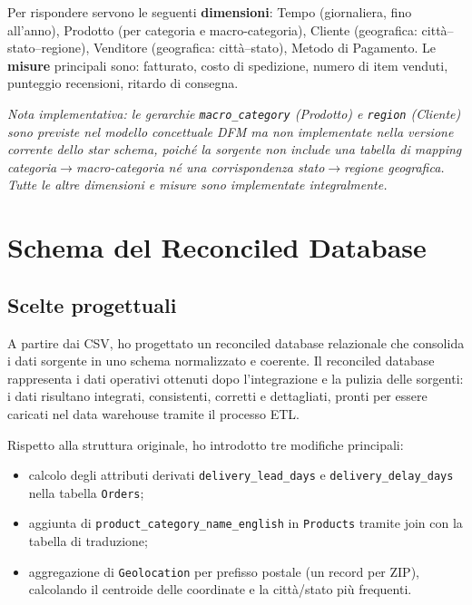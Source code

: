 \documentclass[12pt,a4paper]{article}
\begin{document}
Per rispondere servono le seguenti \textbf{dimensioni}: Tempo (giornaliera, fino
all'anno), Prodotto (per categoria e macro-categoria), Cliente (geografica:
città--stato--regione), Venditore (geografica: città--stato), Metodo di Pagamento.
Le \textbf{misure} principali sono: fatturato, costo di spedizione, numero di item
venduti, punteggio recensioni, ritardo di consegna.

\textit{Nota implementativa: le gerarchie \texttt{macro\_category} (Prodotto) e
\texttt{region} (Cliente) sono previste nel modello concettuale DFM ma non
implementate nella versione corrente dello star schema, poiché la sorgente non
include una tabella di mapping categoria$\to$macro-categoria né una corrispondenza
stato$\to$regione geografica. Tutte le altre dimensioni e misure sono implementate
integralmente.}

\section{Schema del Reconciled Database}

\subsection{Scelte progettuali}

A partire dai CSV, ho progettato un reconciled database relazionale che consolida i
dati sorgente in uno schema normalizzato e coerente. Il reconciled database rappresenta
i dati operativi ottenuti dopo l'integrazione e la pulizia delle sorgenti: i dati
risultano integrati, consistenti, corretti e dettagliati, pronti per essere caricati nel
data warehouse tramite il processo ETL.

Rispetto alla struttura originale, ho introdotto tre modifiche principali:

\begin{itemize}
  \item calcolo degli attributi derivati \texttt{delivery\_lead\_days} e
        \texttt{delivery\_delay\_days} nella tabella \texttt{Orders};
  \item aggiunta di \texttt{product\_category\_name\_english} in \texttt{Products}
        tramite join con la tabella di traduzione;
  \item aggregazione di \texttt{Geolocation} per prefisso postale (un record per ZIP),
        calcolando il centroide delle coordinate e la città/stato più frequenti.
\end{itemize}
\end{document}
